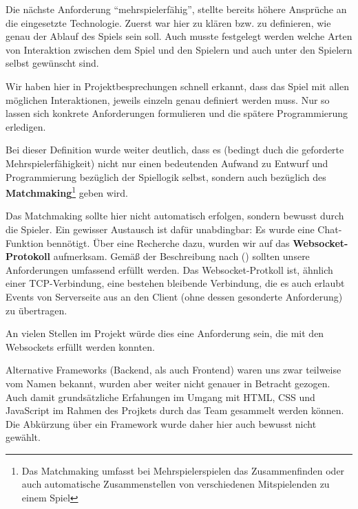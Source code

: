 Die nächste Anforderung \enquote{mehrspielerfähig}, stellte bereits höhere Ansprüche an die eingesetzte Technologie. Zuerst war hier zu klären bzw. zu definieren, wie genau der Ablauf des Spiels sein soll. Auch musste festgelegt werden welche Arten von Interaktion zwischen dem Spiel und den Spielern und auch unter den Spielern selbst gewünscht sind. 

Wir haben hier in Projektbesprechungen schnell erkannt, dass das Spiel mit allen möglichen Interaktionen, jeweils einzeln genau definiert werden muss. Nur so lassen sich konkrete Anforderungen formulieren und die spätere Programmierung erledigen. 

Bei dieser Definition wurde weiter deutlich, dass es (bedingt duch die geforderte Mehrspielerfähigkeit) nicht nur einen bedeutenden Aufwand zu Entwurf und Programmierung bezüglich der Spiellogik selbst, sondern auch bezüglich des \textbf{Matchmaking}\footnote{Das Matchmaking umfasst bei Mehrspielerspielen das Zusammenfinden oder auch automatische Zusammenstellen von verschiedenen Mitspielenden zu einem Spiel} geben wird. 

Das Matchmaking sollte hier nicht automatisch erfolgen, sondern bewusst durch die Spieler. Ein gewisser Austausch ist dafür unabdingbar: Es wurde eine Chat-Funktion bennötigt. Über eine Recherche dazu, wurden wir auf das \textbf{Websocket-Protokoll} aufmerksam. Gemäß der Beschreibung nach \citeauthor{heise-django-2011} (\citeyear{heise-django-2011}) sollten unsere Anforderungen umfassend erfüllt werden. Das Websocket-Protkoll ist, ähnlich einer TCP-Verbindung, eine bestehen bleibende Verbindung, die es auch erlaubt Events von Serverseite aus an den Client (ohne dessen gesonderte Anforderung) zu übertragen. 

An vielen Stellen im Projekt würde dies eine Anforderung sein, die mit den Websockets erfüllt werden konnten. 

Alternative Frameworks (Backend, als auch Frontend) waren uns zwar teilweise vom Namen bekannt, wurden aber weiter nicht genauer in Betracht gezogen. Auch damit grundsätzliche Erfahungen im Umgang mit HTML, CSS und JavaScript im Rahmen des Projkets durch das Team gesammelt werden können. Die Abkürzung über ein Framework wurde daher hier auch bewusst nicht gewählt. 

